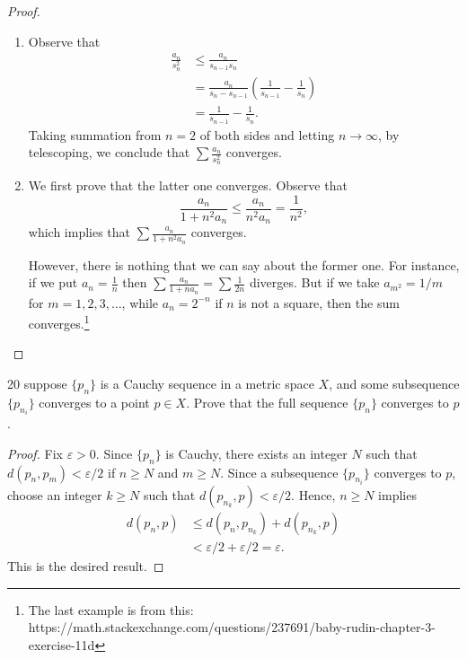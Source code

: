 \begin{proof}
\begin{enumerate}
\item[(c)] Observe that
\begin{align*}
    \frac{a_n}{s_n^2} &\leq \frac{a_n}{s_{n-1}s_n} \\
    &= \frac{a_n}{s_n-s_{n-1}}\left(\frac{1}{s_{n-1}}-\frac{1}{s_n}\right) \\
    &=\frac{1}{s_{n-1}}-\frac{1}{s_n}.
\end{align*}
Taking summation from $n=2$ of both sides and letting $n \to \infty$, by telescoping, we conclude that $\sum \frac{a_n}{s_n^2}$ converges.

\item[(d)] We first prove that the latter one converges.
Observe that
\[
\frac{a_n}{1+n^2a_n} \leq \frac{a_n}{n^2a_n}=\frac{1}{n^2},
\]
which implies that $\sum \frac{a_n}{1+n^2a_n}$ converges.

However, there is nothing that we can say about the former one.
For instance, if we put $a_n=\frac{1}{n}$ then $\sum \frac{a_n}{1+na_n}=\sum \frac{1}{2n}$ diverges. 
But if we take $a_{m^2}=1/m$ for $m=1,2,3, \ldots$, while $a_n=2^{-n}$ if $n$ is not a square, then the sum converges.\footnote{The last example is from this: https://math.stackexchange.com/questions/237691/baby-rudin-chapter-3-exercise-11d}
\end{enumerate}
\end{proof}

\begin{exercise}{20}
suppose $\{p_n\}$ is a Cauchy sequence in a metric space $X$, and some subsequence $\{p_{n_i}\}$ converges to a point $p \in X$.
Prove that the full sequence $\{p_n\}$ converges to $p$.
\end{exercise}
\begin{proof}
Fix $\varepsilon>0$.
Since $\{p_n\}$ is Cauchy, there exists an integer $N$ such that $d(p_n,p_m)<\varepsilon/2$ if $n \geq N$ and $m \geq N$.
Since a subsequence $\{p_{n_i}\}$ converges to $p$, choose an integer $k \geq N$ such that $d(p_{n_k},p)<\varepsilon/2$.
Hence, $n \geq N$ implies
\begin{align*}
d(p_n,p) &\leq d(p_n, p_{n_k})+d(p_{n_k}, p) \\
&<\varepsilon/2+\varepsilon/2=\varepsilon.
\end{align*}
This is the desired result.
\end{proof}